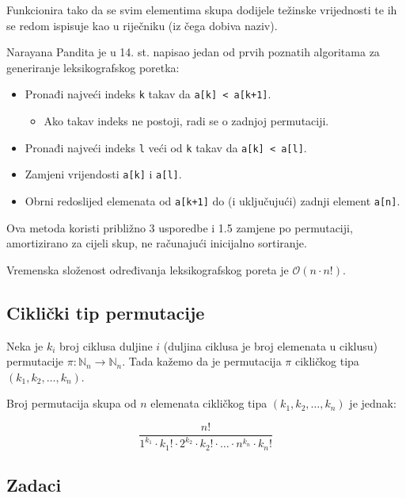 Funkcionira tako da se svim elementima skupa dodijele težinske vrijednosti te ih
se redom ispisuje kao u riječniku (iz čega dobiva naziv).

Narayana Pandita je u 14. st. napisao jedan od prvih poznatih algoritama za
generiranje leksikografskog poretka:

\begin{itemize}
    \item Pronađi najveći indeks \verb|k| takav da \verb|a[k] < a[k+1]|.
    \begin{itemize}
        \item Ako takav indeks ne postoji, radi se o zadnjoj permutaciji.
    \end{itemize}
    \item Pronađi najveći indeks \verb|l| veći od \verb|k| takav da \verb|a[k] < a[l]|.
    \item Zamjeni vrijendosti \verb|a[k]| i \verb|a[l]|.
    \item Obrni redoslijed elemenata od \verb|a[k+1]| do (i uključujući) zadnji
    element \verb|a[n]|.
\end{itemize}

Ova metoda koristi približno 3 usporedbe i 1.5 zamjene po permutaciji,
amortizirano za cijeli skup, ne računajući inicijalno sortiranje.

\noindent
Vremenska složenost određivanja leksikografskog poreta je $\mathcal{O}(n\cdot n!)$.

\subsection{Ciklički tip permutacije}

Neka je $k_i$ broj ciklusa duljine $i$ (duljina ciklusa je broj elemenata u ciklusu) permutacije $\pi : \mathbb{N}_n \to \mathbb{N}_n$. Tada kažemo da je permutacija $\pi$ cikličkog tipa $(k_1, k_2, \dots, k_n)$.

\begin{theorem}
    Broj permutacija skupa od $n$ elemenata cikličkog tipa $(k_1, k_2, \dots,
    k_n)$ je jednak:

    $$
        \frac{n!}{1^{k_1}\cdot k_1! \cdot 2^{k_2}\cdot k_2! \cdot \dots \cdot n^{k_n} \cdot k_n!}
    $$
\end{theorem}

\subsection{Zadaci}

